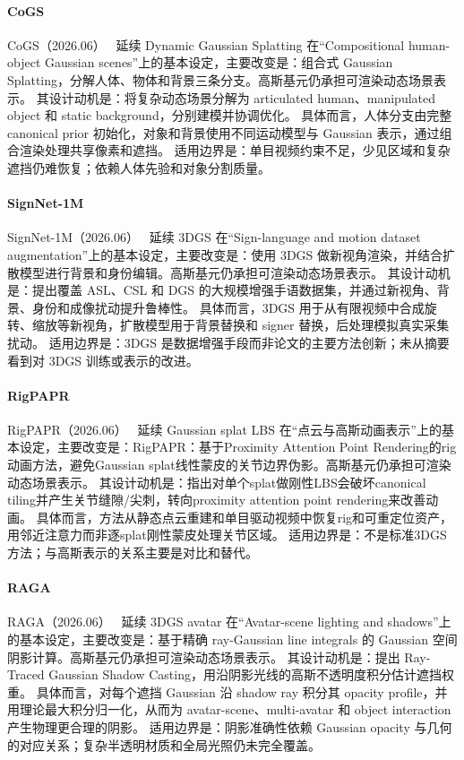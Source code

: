 \paragraph{CoGS}
CoGS（2026.06）~\cite{2606_28820} 延续 Dynamic Gaussian Splatting 在“Compositional human-object Gaussian scenes”上的基本设定，主要改变是：组合式 Gaussian Splatting，分解人体、物体和背景三条分支。高斯基元仍承担可渲染动态场景表示。
其设计动机是：将复杂动态场景分解为 articulated human、manipulated object 和 static background，分别建模并协调优化。
具体而言，人体分支由完整 canonical prior 初始化，对象和背景使用不同运动模型与 Gaussian 表示，通过组合渲染处理共享像素和遮挡。
适用边界是：单目视频约束不足，少见区域和复杂遮挡仍难恢复；依赖人体先验和对象分割质量。

\paragraph{SignNet-1M}
SignNet-1M（2026.06）~\cite{2606_24361} 延续 3DGS 在“Sign-language and motion dataset augmentation”上的基本设定，主要改变是：使用 3DGS 做新视角渲染，并结合扩散模型进行背景和身份编辑。高斯基元仍承担可渲染动态场景表示。
其设计动机是：提出覆盖 ASL、CSL 和 DGS 的大规模增强手语数据集，并通过新视角、背景、身份和成像扰动提升鲁棒性。
具体而言，3DGS 用于从有限视频中合成旋转、缩放等新视角，扩散模型用于背景替换和 signer 替换，后处理模拟真实采集扰动。
适用边界是：3DGS 是数据增强手段而非论文的主要方法创新；未从摘要看到对 3DGS 训练或表示的改进。

\paragraph{RigPAPR}
RigPAPR（2026.06）~\cite{2606_06685} 延续 Gaussian splat LBS 在“点云与高斯动画表示”上的基本设定，主要改变是：RigPAPR：基于Proximity Attention Point Rendering的rig动画方法，避免Gaussian splat线性蒙皮的关节边界伪影。高斯基元仍承担可渲染动态场景表示。
其设计动机是：指出对单个splat做刚性LBS会破坏canonical tiling并产生关节缝隙/尖刺，转向proximity attention point rendering来改善动画。
具体而言，方法从静态点云重建和单目驱动视频中恢复rig和可重定位资产，用邻近注意力而非逐splat刚性蒙皮处理关节区域。
适用边界是：不是标准3DGS方法；与高斯表示的关系主要是对比和替代。

\paragraph{RAGA}
RAGA（2026.06）~\cite{2606_29329} 延续 3DGS avatar 在“Avatar-scene lighting and shadows”上的基本设定，主要改变是：基于精确 ray-Gaussian line integrals 的 Gaussian 空间阴影计算。高斯基元仍承担可渲染动态场景表示。
其设计动机是：提出 Ray-Traced Gaussian Shadow Casting，用沿阴影光线的高斯不透明度积分估计遮挡权重。
具体而言，对每个遮挡 Gaussian 沿 shadow ray 积分其 opacity profile，并用理论最大积分归一化，从而为 avatar-scene、multi-avatar 和 object interaction 产生物理更合理的阴影。
适用边界是：阴影准确性依赖 Gaussian opacity 与几何的对应关系；复杂半透明材质和全局光照仍未完全覆盖。

